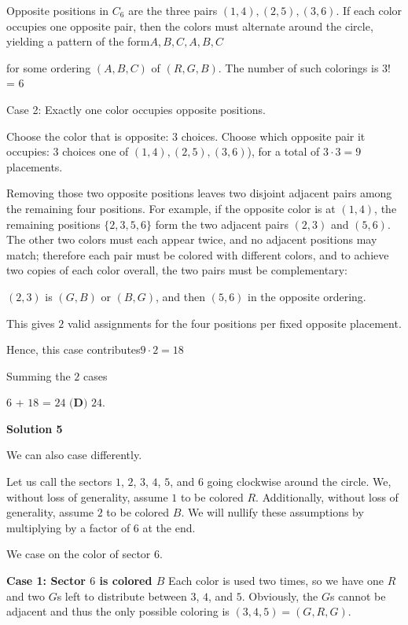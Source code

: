 \begin{enumerate}
 
Opposite positions in \(C_6\) are the three pairs \((1,4), (2,5), (3,6)\). If each color occupies one opposite pair, then the colors must alternate around the circle, yielding a pattern of the form{$A,B,C,A,B,C$}

 for some ordering \((A,B,C)\) of \((R,G,B)\). The number of such colorings is $3!$ = $6$

 
{Case 2: Exactly one color occupies opposite positions.}

 
Choose the color that is opposite: \(3\) choices. Choose which opposite pair it occupies: \(3\) choices one of \((1,4), (2,5), (3,6)\)), for a total of \(3\cdot 3 = 9\) placements.

 Removing those two opposite positions leaves two disjoint adjacent pairs among the remaining four positions. For example, if the opposite color is at \((1,4)\), the remaining positions \(\{2,3,5,6\}\) form the two adjacent pairs \((2,3)\) and \((5,6)\). The other two colors must each appear twice, and no adjacent positions may match; therefore each pair must be colored with different colors, and to achieve two copies of each color overall, the two pairs must be complementary:

 $(2,3)$ is $(G,B)$ or $(B,G)$, and then $(5,6)$ in the opposite ordering.

 This gives \(2\) valid assignments for the four positions per fixed opposite placement.

 Hence, this case contributes\(9\cdot 2 = 18\)

 Summing the $2$ cases

 $6$ + $18$ = $24$
$\boxed{\textbf{(D) } 24}$.

 



\textbf{Solution 5}

We can also case differently.

 Let us call the sectors $1$, $2$, $3$, $4$, $5$, and $6$ going clockwise around the circle. We, without loss of generality, assume $1$ to be colored $R$. Additionally, without loss of generality, assume $2$ to be colored $B$. We will nullify these assumptions by multiplying by a factor of $6$ at the end.

 We case on the color of sector $6$.

 \textbf{Case 1: Sector $6$ is colored $B$} Each color is used two times, so we have one $R$ and two $G$s left to distribute between $3$, $4$, and $5$. Obviously, the $G$s cannot be adjacent and thus the only possible coloring is $(3, 4, 5) = (G, R, G)$.


\end{enumerate}
